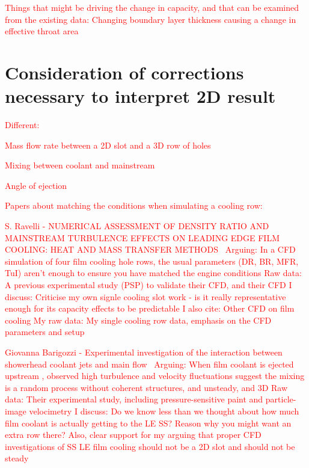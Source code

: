 \documentclass[a4paper, 11pt, oneside]{report}
\begin{document}
\textcolor{red}{Things that might be driving the change in capacity, and that can be examined from the existing data:}
	\textcolor{red}{Changing boundary layer thickness causing a change in effective throat area}

    
\section{Consideration of corrections necessary to interpret 2D result}

\textcolor{red}{Different:}

\textcolor{red}{Mass flow rate between a 2D slot and a 3D row of holes}

\textcolor{red}{Mixing between coolant and mainstream}

\textcolor{red}{Angle of ejection}

\textcolor{red}{Papers about matching the conditions when simulating a cooling row:}

\textcolor{red}{S. Ravelli - NUMERICAL ASSESSMENT OF DENSITY RATIO AND MAINSTREAM TURBULENCE EFFECTS ON LEADING EDGE FILM COOLING: HEAT AND MASS TRANSFER METHODS~\cite{ravelli_engine_conditions}}
		\textcolor{red}{Arguing: In a CFD simulation of four film cooling hole rows, the usual parameters (DR, BR, MFR, TuI) aren't enough to ensure you have matched the engine conditions}
		\textcolor{red}{Raw data: A previous experimental study (PSP) to validate their CFD, and their CFD}
		\textcolor{red}{I discuss: Criticise my own signle cooling slot work - is it really representative enough for its capacity effects to be predictable}
		\textcolor{red}{I also cite: Other CFD on film cooling}
		\textcolor{red}{My raw data: My single cooling row data, emphasis on the CFD parameters and setup}
		
\textcolor{red}{Giovanna Barigozzi - Experimental investigation of the interaction between showerhead coolant jets and main flow~\cite{barigozzi_film_cooling}}
		\textcolor{red}{Arguing: When film coolant is ejected upstream , observed high turbulence and velocity fluctuations suggest the mixing is a random process without coherent structures, and unsteady, and 3D}
		\textcolor{red}{Raw data: Their experimental study, including pressure-sensitive paint and particle-image velocimetry}
		\textcolor{red}{I discuss: Do we know less than we thought about how much film coolant is actually getting to the LE SS? Reason why you might want an extra row there? Also, clear support for my arguing that proper CFD investigations of SS LE film cooling should not be a 2D slot and should not be steady}
		
\end{document}
